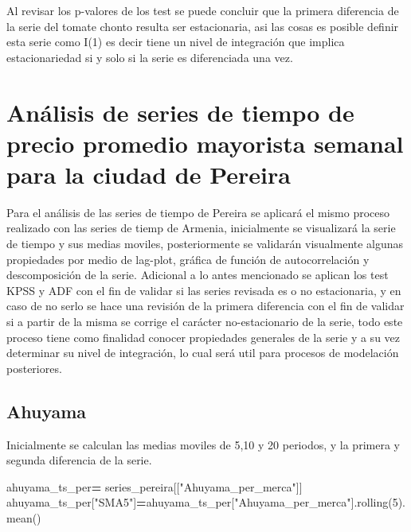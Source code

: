 \documentclass[
]{book}
\newenvironment{Shaded}{\begin{snugshade}}{\end{snugshade}}
\newcommand{\DecValTok}[1]{\textcolor[rgb]{0.00,0.00,0.81}{#1}}
\newcommand{\NormalTok}[1]{#1}
\newcommand{\OperatorTok}[1]{\textcolor[rgb]{0.81,0.36,0.00}{\textbf{#1}}}
\newcommand{\StringTok}[1]{\textcolor[rgb]{0.31,0.60,0.02}{#1}}
\begin{document}
Al revisar los p-valores de los test se puede concluir que la primera diferencia de la serie del tomate chonto resulta ser estacionaria, asi las cosas es posible definir esta serie como I(1) es decir tiene un nivel de integración que implica estacionariedad si y solo si la serie es diferenciada una vez.

\hypertarget{anuxe1lisis-de-series-de-tiempo-de-precio-promedio-mayorista-semanal-para-la-ciudad-de-pereira}{%
\section{Análisis de series de tiempo de precio promedio mayorista semanal para la ciudad de Pereira}\label{anuxe1lisis-de-series-de-tiempo-de-precio-promedio-mayorista-semanal-para-la-ciudad-de-pereira}}

Para el análisis de las series de tiempo de Pereira se aplicará el mismo proceso realizado con las series de tiemp de Armenia, inicialmente se visualizará la serie de tiempo y sus medias moviles, posteriormente se validarán visualmente algunas propiedades por medio de lag-plot, gráfica de función de autocorrelación y descomposición de la serie. Adicional a lo antes mencionado se aplican los test KPSS y ADF con el fin de validar si las series revisada es o no estacionaria, y en caso de no serlo se hace una revisión de la primera diferencia con el fin de validar si a partir de la misma se corrige el carácter no-estacionario de la serie, todo este proceso tiene como finalidad conocer propiedades generales de la serie y a su vez determinar su nivel de integración, lo cual será util para procesos de modelación posteriores.

\hypertarget{ahuyama-1}{%
\subsection{Ahuyama}\label{ahuyama-1}}

Inicialmente se calculan las medias moviles de 5,10 y 20 periodos, y la primera y segunda diferencia de la serie.

\begin{Shaded}
\begin{Highlighting}[]

\NormalTok{ahuyama\_ts\_per}\OperatorTok{=}\NormalTok{ series\_pereira[[}\StringTok{"Ahuyama\_per\_merca"}\NormalTok{]]}
\NormalTok{ahuyama\_ts\_per[}\StringTok{"SMA5"}\NormalTok{]}\OperatorTok{=}\NormalTok{ahuyama\_ts\_per[}\StringTok{"Ahuyama\_per\_merca"}\NormalTok{].rolling(}\DecValTok{5}\NormalTok{).mean()}
\end{Highlighting}
\end{Shaded}
\end{document}

